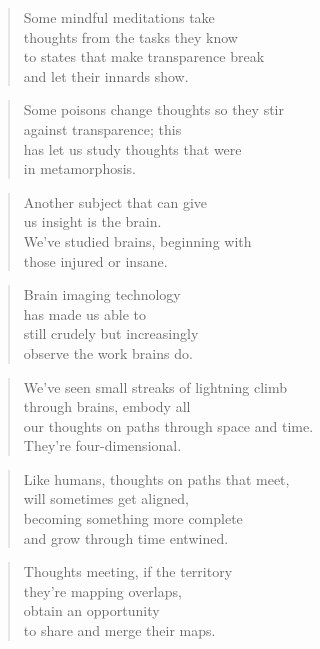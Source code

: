 \documentclass[14pt,a4paper]{article}
\begin{document}
\begin{verse}
Some mindful meditations take\\
thoughts from the tasks they know\\
to states that make transparence break\\
and let their innards show.
\end{verse}

\begin{verse}
Some poisons change thoughts so they stir\\
against transparence; this\\
has let us study thoughts that were\\
in metamorphosis.
\end{verse}

\begin{verse}
Another subject that can give\\
us insight is the brain.\\
We’ve studied brains, beginning with\\
those injured or insane.
\end{verse}

\begin{verse}
Brain imaging technology\\
has made us able to\\
still crudely but increasingly\\
observe the work brains do.
\end{verse}

\begin{verse}
We’ve seen small streaks of lightning climb\\
through brains, embody all\\
our thoughts on paths through space and time.\\
They’re four-dimensional.
\end{verse}

\begin{verse}
Like humans, thoughts on paths that meet,\\
will sometimes get aligned,\\
becoming something more complete\\
and grow through time entwined.
\end{verse}

\begin{verse}
Thoughts meeting, if the territory\\
they’re mapping overlaps,\\
obtain an opportunity\\
to share and merge their maps.
\end{verse}
\end{document}

